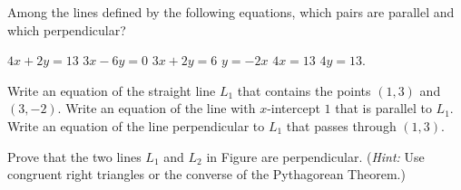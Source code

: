 \begin{exercises}
Among the lines defined by the following equations,
which pairs are parallel and which perpendicular?
\begin{exenum}
\sx
$4x + 2y = 13$
\sx
$3x - 6y = 0$
\sx
$3x + 2y = 6$
\sx
$y = -2x$
\sx
$4x = 13$
\sx
$4y = 13$.
\end{exenum}

\begin{exenum}
\sx
Write an equation of the straight line $L_1$ that contains the points
$(1,3)$ and $(3, -2)$.
\sx
Write an equation of the line with $x$-intercept $1$
that is parallel to $L_1$.
\sx
Write an equation of the line perpendicular to $L_1$ that passes
through $(1, 3)$.
\end{exenum}

Prove that the two lines $L_1$ and $L_2$ in Figure  are
perpendicular.  (\emph{Hint:} Use congruent right triangles
or the converse of the Pythagorean Theorem.)


\end{exercises}
